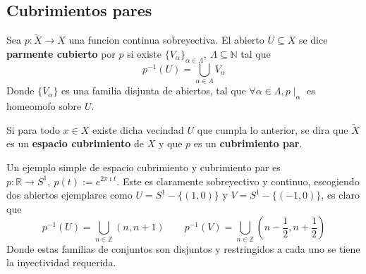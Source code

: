 \subsection{Cubrimientos pares}
\begin{definicion}
Sea \(p : \tilde{X} \to X\) una funcion continua sobreyectiva. El abierto \(U
\subseteq X\) se dice \textbf{parmente cubierto} por \(p\) si existe
\(\{V_\alpha\}_{\alpha \in \Lambda},\ \Lambda \subseteq \mathbb N\) tal que
\[ p^{-1} (U) = \bigcup_{\alpha \in \Lambda} V_\alpha \]
Donde \(\{V_\alpha\}\) es una familia disjunta de abiertos, tal que
\(\forall \alpha \in \Lambda, p \mid_{\alpha}\) es homeomofo sobre \(U\).

Si para todo \(x \in X\) existe dicha vecindad \(U\) que cumpla lo
anterior, se dira que \(\tilde{X}\) es un \textbf{espacio cubrimiento} de \(X\)
y que \(p\) es un \textbf{cubrimiento par}.
\end{definicion}

Un ejemplo simple de espacio cubrimiento y cubrimiento par es \(p :
\mathbb R \to S^1,\ p(t) := e^{2 \pi \imath t}\). Este es claramente
sobreyectivo y continuo, escogiendo dos abiertos ejemplares como \(U =
S^1 - \{(1,0)\}\) y \(V = S^1 - \{(-1,0)\}\), es claro que
\[
    p^{-1} (U) = \bigcup_{n \in \mathbb Z} (n, n+1)
    \qquad p^{-1} (V) = \bigcup_{n \in \mathbb Z} (n - \frac 1 2, n + \frac 1
    2 )
\]
Donde estas familias de conjuntos son disjuntos y restringidos a cada
uno se tiene la inyectividad requerida.

